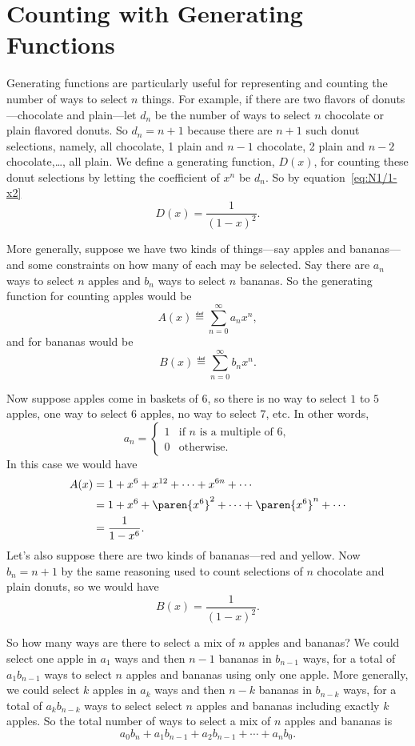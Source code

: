 \section{Counting with Generating Functions}\label{sec:gf_counting}
Generating functions are particularly useful for representing and
counting the number of ways to select $n$ things.  For example, if
there are two flavors of donuts---chocolate and plain---let $d_n$
be the number of ways to select $n$ chocolate or plain flavored
donuts.  So $d_n =n+1$ because there are $n+1$ such donut selections,
namely, all chocolate, 1 plain and $n-1$ chocolate, 2 plain and
$n-2$ chocolate,\dots, all plain.  We define a generating function,
$D(x)$, for counting these donut selections by letting the
coefficient of $x^n$ be $d_n$.  So by equation~\eqref{eq:N1/1-x2}
\begin{equation}\label{2donutgen}
D(x) = \frac{1}{(1-x)^2}.
\end{equation}

More generally, suppose we have two kinds of things---say apples and
bananas---and some constraints on how many of each may be selected.
Say there are $a_n$ ways to select $n$ apples and $b_n$ ways to select
$n$ bananas.  So the generating function for counting apples would be
\[
A(x) \eqdef \sum_{n=0}^\infty a_nx^n,
\]
and for bananas would be
\[
B(x) \eqdef \sum_{n=0}^\infty b_nx^n.
\]

Now suppose apples come in baskets of 6, so there is no way to select
$1$ to $5$ apples, one way to select 6 apples, no way to select 7,
etc.  In other words,
\[
a_n = \begin{cases}
      1 & \text{if $n$ is a multiple of 6},\\
      0 & \text{otherwise}.
\end{cases}
\]
In this case we would have
\begin{align*}
A(x)
& = 1 + x^6 + x^{12} + \cdots + x^{6n} + \cdots\\
& = 1 + x^6 + \paren{x^6}^2 + \cdots +\paren{x^6}^n + \cdots\\
& = \frac{1}{1 - x^6}.
\end{align*}
Let's also suppose there are two kinds of bananas---red and yellow.
Now $b_n = n+1$ by the same reasoning used to count selections of $n$
chocolate and plain donuts, so we would have
\[
B(x) = \frac{1}{(1-x)^2}.
\]

So how many ways are there to select a mix of $n$ apples and bananas?
We could select one apple in $a_1$ ways and then $n-1$ bananas in
$b_{n-1}$ ways, for a total of $a_1b_{n-1}$ ways to select $n$ apples
and bananas using only one apple.  More generally, we could select $k$
apples in $a_k$ ways and then $n-k$ bananas in $b_{n-k}$ ways, for a
total of $a_kb_{n-k}$ ways to select select $n$ apples and bananas
including exactly $k$ apples.  So the total number of ways to select a
mix of $n$ apples and bananas is
\begin{equation}\label{a0bnconvolve}
a_0b_n + a_1b_{n-1} + a_2b_{n-1} + \cdots + a_nb_0.
\end{equation}

